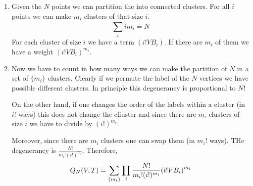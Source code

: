 \documentclass[../main/main.tex]{subfiles}
\begin{document}
\begin{enumerate}
\item Given the \( N \) points we can partition the into connected clusters. For all \( i \) points we can make \( m_i \) clusters of that size \( i \).
\begin{equation}
  \sum_{i}^{} i m_i = N
\end{equation}
For each cluster of size \( i \) we have a term \( (i!VB_i) \). If there are \( m_i \) of them we have a weight \( (i! V B_i)^{m_i} \).
\item Now we have to count in how many ways we can make the partition of \( N \) in a set of \( \{ m_i \}   \) clusters. Clearly if we permute the label of the \( N \) vertices we have possible different clusters. In principle this degenerancy is proportional to \( N \)!

On the other hand, if one changes the order of the labels within a cluster (in \( i! \) ways) this does not change the cliuster and since there are \( m_i \) clusters of size \( i \) we have to divide by \( (i!)^{m_i} \).

Moreover, since there are \( m_i \) clusters one can swap them (in \( m_i! \) ways). THe degenerancy is \( \frac{N!}{m_i! (i!)^{m_i}} \). Therefore,
\begin{equation}
  Q_N (V,T) = \sum_{\{ m_i \}  }^{} \prod_{i}^{}    \frac{N!}{m_i! (i!)^{m_i}} \qty(i! V B_i)^{m_i}
\end{equation}
\end{enumerate}
\end{document}

